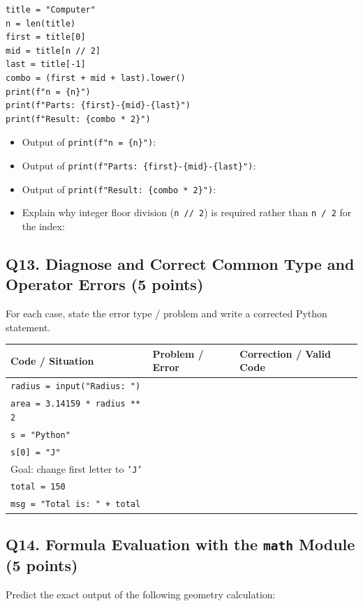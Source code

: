 \documentclass[11pt,a4paper]{article}
\begin{document}
\begin{lstlisting}
title = "Computer"
n = len(title)
first = title[0]
mid = title[n // 2]
last = title[-1]
combo = (first + mid + last).lower()
print(f"n = {n}")
print(f"Parts: {first}-{mid}-{last}")
print(f"Result: {combo * 2}")
\end{lstlisting}

\begin{itemize}[leftmargin=2em]
  \item Output of \texttt{print(f"n = \{n\}")}: \underline{\hspace{5cm}}
  \item Output of \texttt{print(f"Parts: \{first\}-\{mid\}-\{last\}")}: \underline{\hspace{5cm}}
  \item Output of \texttt{print(f"Result: \{combo * 2\}")}: \underline{\hspace{5cm}}
  \item Explain why integer floor division (\texttt{n // 2}) is required rather than \texttt{n / 2} for the index: \hrulefill
\end{itemize}

\subsection*{Q13. Diagnose and Correct Common Type and Operator Errors (5 points)}
For each case, state the error type / problem and write a corrected Python statement.

\renewcommand{\arraystretch}{1.35}
\begin{tabularx}{\textwidth}{|p{5.1cm}|X|X|}
\hline
\textbf{Code / Situation} & \textbf{Problem / Error} & \textbf{Correction / Valid Code} \\
\hline
\texttt{radius = input("Radius: ")}\\
\texttt{area = 3.14159 * radius ** 2} & & \\[4mm]
\hline
\texttt{s = "Python"}\\
\texttt{s[0] = "J"}\\
Goal: change first letter to \texttt{'J'} & & \\[4mm]
\hline
\texttt{total = 150}\\
\texttt{msg = "Total is: " + total} & & \\[4mm]
\hline
\end{tabularx}

\subsection*{Q14. Formula Evaluation with the \texttt{math} Module (5 points)}
Predict the exact output of the following geometry calculation:
\end{document}
